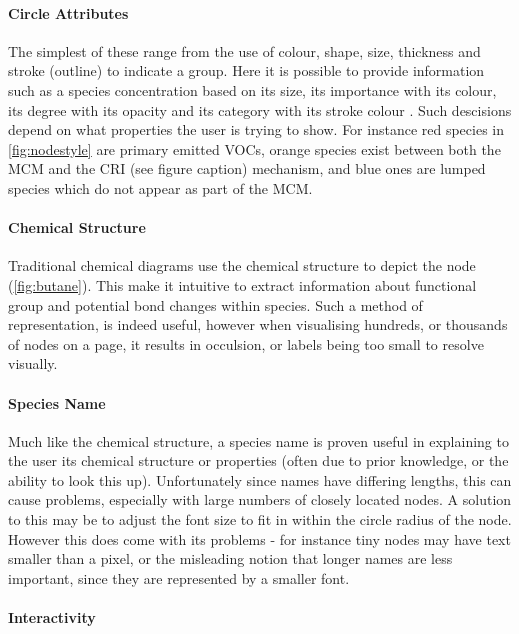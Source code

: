 \paragraph*{\color{c4}Circle Attributes}

The simplest of these range from the use of colour, shape, size, thickness and stroke (outline) to indicate a group. Here it is possible to provide information such as a species concentration based on its size, its importance with its colour, its degree with its opacity and its category with its stroke colour \citep{colourb,rightness}. Such descisions depend on what properties the user is trying to show. For instance red species in \autoref{fig:nodestyle} are primary emitted VOCs, orange species exist between both the MCM and the CRI (see figure caption) mechanism, and blue ones are lumped species which do not appear as part of the MCM.  


\paragraph*{\color{c1}Chemical Structure}
Traditional chemical diagrams use the chemical structure to depict the node (\autoref{fig:butane}). This make it intuitive to extract information about functional group and potential bond changes within species. Such a method of representation, is indeed useful, however when visualising hundreds, or thousands of nodes on a page, it results in occulsion, or labels being too small to resolve visually. 

\paragraph*{\color{c2}Species Name}

Much like the chemical structure, a species name is proven useful in explaining to the user its chemical structure or properties (often due to prior knowledge, or the ability to look this up). Unfortunately since names have differing lengths, this can cause problems, especially with large numbers of closely located nodes. A solution to this may be to adjust the font size to fit in within the circle radius of the node. However this does come with its problems - for instance tiny nodes may have text smaller than a pixel, or the misleading notion that longer names are less important, since they are represented by a smaller font. 


\paragraph*{\color{c3}Interactivity}

